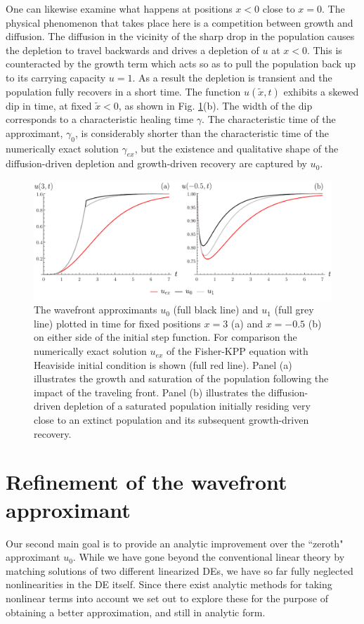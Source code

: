 \documentclass[amsmath,amssymb,amsfonts,aps,pre,preprint,superscriptaddress,showpacs,showkeys,longbibliography,nofootinbib]{revtex4-1}
\begin{document}
One can likewise examine what happens at positions $x<0$ close to $x=0$. The physical phenomenon that takes place here is a competition between growth and diffusion. The diffusion in the vicinity of the sharp drop in the population causes the depletion to travel backwards and drives a depletion of $u$ at $x<0$. This is counteracted by the growth term which acts so as to pull the population back up to its carrying capacity $u=1$. As a result the depletion is transient and the population fully recovers in a short time. The function $u(\tilde x,t)$ exhibits a skewed dip in time, at fixed $\tilde x <0$, as shown in Fig. \ref{fig:GridSimoide}(b). The width of the dip corresponds to a characteristic healing time $\gamma$. The characteristic time of the approximant, $\gamma_0$, is considerably shorter than the characteristic time of the numerically exact solution $\gamma_{ex}$, but the existence and qualitative shape of the diffusion-driven depletion and growth-driven recovery are captured by $u_0$. 
\begin{figure}[t]
    \centering
    \includegraphics[width=\linewidth]{Figures/GridSimoideAlt.pdf}
    \caption{The wavefront approximants $u_0$ (full black line) and $u_1$ (full grey line) plotted in time for fixed positions $x=3$ (a) and $x=-0.5$ (b) on either side of the initial step function. For comparison the numerically exact solution $u_{ex}$ of the Fisher-KPP equation with Heaviside initial condition is shown (full red line). Panel (a) illustrates the growth and saturation of the population following the impact of the traveling front. Panel (b) illustrates the diffusion-driven depletion of a saturated population initially residing very close to an extinct population and its subsequent growth-driven recovery.}
    \label{fig:GridSimoide}
\end{figure}
\section{Refinement of the wavefront approximant} \label{sec:refinement}
Our second main goal is to provide an analytic improvement over the ``zeroth" approximant $u_0$. While we have gone beyond the conventional linear theory by matching solutions of two different linearized DEs, we have so far fully neglected nonlinearities in the DE itself. Since there exist analytic methods for taking nonlinear terms into account we set out to explore these for the purpose of obtaining a better approximation, and still in analytic form. 
\end{document}
